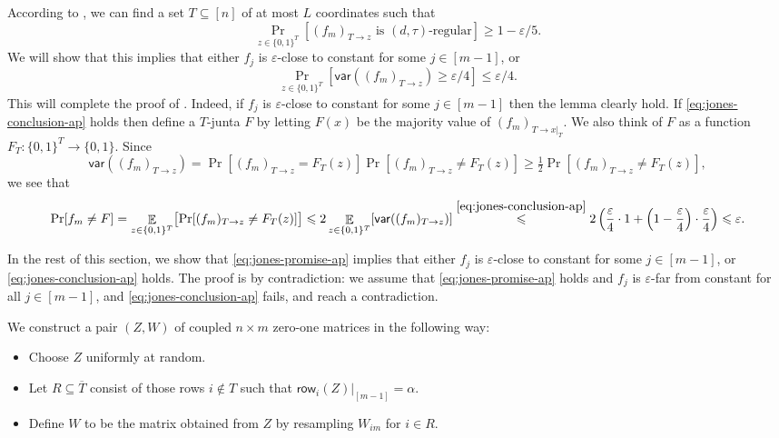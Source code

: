 \documentclass{article}
\theoremstyle{definition}
\theoremstyle{remark}
\providecommand{\row}{\mathsf{row}}
\DeclareMathOperator*{\E}{\mathbb{E}}
\providecommand{\V}[1]{\mathsf{var}(#1)}
\newcommand\eps{\varepsilon}
\renewcommand\epsilon{\eps}
\renewcommand\geq{\geqslant}
\renewcommand\leq{\leqslant}
\begin{document}
According to , we can find a set $T \subseteq [n]$ of at most $L$ coordinates such that
\begin{equation} \label{eq:jones-promise-ap}
 \Pr_{z \in \{0,1\}^T}[\text{$(f_m)_{T \to z}$ is  $(d,\tau)$-regular}] \geq 1-\epsilon/5.
\end{equation}
We will show that this implies that either $f_j$ is $\epsilon$-close to constant for some $j \in [m-1]$, or
\begin{equation} \label{eq:jones-conclusion-ap}
\Pr_{z \in \{0,1\}^T} [\V{(f_m)_{T \to z}} \geq \epsilon/4] \leq \epsilon/4.
\end{equation}
This will complete the proof of .
Indeed, if $f_j$ is $\epsilon$-close to constant for some $j \in [m-1]$ then the lemma clearly hold. If \eqref{eq:jones-conclusion-ap} holds then define a $T$-junta $F$ by letting $F(x)$ be the majority value of $(f_m)_{T \to x|_T}$. We also think of $F$ as a function $F_T\colon \{0,1\}^T \to \{0,1\}$. Since
\[
 \V{(f_m)_{T \to z}} = \Pr[(f_m)_{T \to z} = F_T(z)] \Pr[(f_m)_{T \to z} \neq F_T(z)] \geq \tfrac{1}{2} \Pr[(f_m)_{T \to z} \neq F_T(z)],
\]
we see that
\[
 \Pr[f_m \neq F] = \E_{z \in \{0,1\}^T} \bigl[ \Pr[(f_m)_{T \to z} \neq F_T(z)] \bigr] \leq
 2\E_{z \in \{0,1\}^T}[\V{(f_m)_{T \to z}}] \stackrel{\eqref{eq:jones-conclusion-ap}}\leq
 2 \left(\frac{\epsilon}{4} \cdot 1 + \left(1 - \frac{\epsilon}{4}\right) \cdot \frac{\epsilon}{4}\right) \leq \epsilon.
\]

In the rest of this section, we show that \eqref{eq:jones-promise-ap} implies that either $f_j$ is $\epsilon$-close to constant for some $j \in [m-1]$, or \eqref{eq:jones-conclusion-ap} holds. The proof is by contradiction: we assume that \eqref{eq:jones-promise-ap} holds and $f_j$ is $\epsilon$-far from constant for all $j \in [m-1]$, and \eqref{eq:jones-conclusion-ap} fails, and reach a contradiction.

\medskip

We construct a pair $(Z,W)$ of coupled $n \times m$ zero-one matrices in the following way:
\begin{itemize}
    \item Choose $Z$ uniformly at random.
    \item Let $R \subseteq \overline{T}$ consist of those rows $i \notin T$ such that $\row_i(Z)|_{[m-1]} = \alpha$.
    \item Define $W$ to be the matrix obtained from $Z$ by resampling $W_{im}$ for $i \in R$.
\end{itemize}
\end{document}

